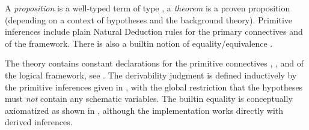 \begin{isabellebody}
\begin{isamarkuptext}
\begin{description}
  \end{description}%
\end{isamarkuptext}%
\isamarkuptrue%
%
\endisatagmlantiq
{\isafoldmlantiq}%
%
\isadelimmlantiq
%
\endisadelimmlantiq
%
\isamarkuptrue%
%
\begin{isamarkuptext}%
A \emph{proposition} is a well-typed term of type , a
  \emph{theorem} is a proven proposition (depending on a context of
  hypotheses and the background theory).  Primitive inferences include
  plain Natural Deduction rules for the primary connectives  and  of the framework.  There is also a builtin
  notion of equality/equivalence .%
\end{isamarkuptext}%
\isamarkuptrue%
%
\isamarkuptrue%
%
\begin{isamarkuptext}%
The theory  contains constant declarations for the
  primitive connectives , , and  of
  the logical framework, see .  The
  derivability judgment  is
  defined inductively by the primitive inferences given in
  , with the global restriction that the
  hypotheses must \emph{not} contain any schematic variables.  The
  builtin equality is conceptually axiomatized as shown in
  , although the implementation works
  directly with derived inferences.


\end{isamarkuptext}
\end{isabellebody}
